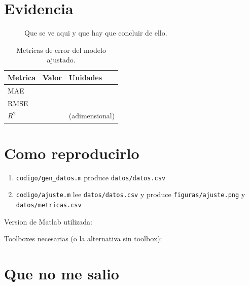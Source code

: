 \documentclass[11pt,letterpaper]{article}
\begin{document}
\section{Evidencia}

\begin{figure}[htbp]
  \centering
  \caption{Que se ve aqui y que hay que concluir de ello.}
  \label{fig:resultado}
\end{figure}

\begin{table}[htbp]
  \centering
  \caption{Metricas de error del modelo ajustado.}
  \label{tab:metricas}
  \begin{tabular}{lrl}
    \toprule
    Metrica & Valor & Unidades \\
    \midrule
    MAE  & & \\
    RMSE & & \\
    $R^2$ & & (adimensional) \\
    \bottomrule
  \end{tabular}
\end{table}

\section{Como reproducirlo}

\begin{enumerate}
  \item \texttt{codigo/gen\_datos.m} produce \texttt{datos/datos.csv}
  \item \texttt{codigo/ajuste.m} lee \texttt{datos/datos.csv} y produce
        \texttt{figuras/ajuste.png} y \texttt{datos/metricas.csv}
\end{enumerate}

Version de Matlab utilizada:

Toolboxes necesarias (o la alternativa sin toolbox):

\section{Que no me salio}
\end{document}
